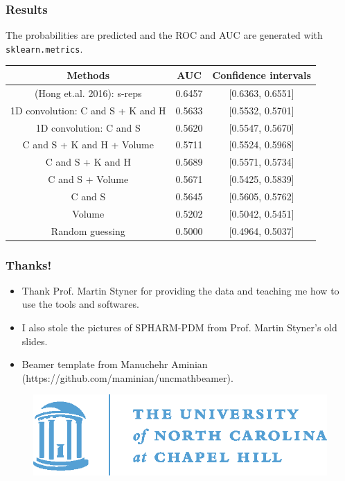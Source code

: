\documentclass{beamer}
\begin{document}
\begin{frame}
\frametitle{Results}
The probabilities are predicted and the ROC and AUC are generated with \texttt{sklearn.metrics}.
\begin{center}
\begin{tabular}{|c|c|c|}\hline
Methods & AUC & Confidence intervals \\ \hline
(Hong et.al. 2016): s-reps & 0.6457 & [0.6363, 0.6551] \\ \hline
1D convolution: C and S + K and H & 0.5633 & [0.5532, 0.5701] \\ \hline
1D convolution: C and S & 0.5620 & [0.5547, 0.5670] \\ \hline
C and S + K and H + Volume & 0.5711 & [0.5524, 0.5968] \\ \hline
C and S + K and H & 0.5689 & [0.5571, 0.5734] \\ \hline
C and S + Volume & 0.5671 & [0.5425, 0.5839] \\ \hline
C and S& 0.5645 & [0.5605, 0.5762] \\ \hline
Volume& 0.5202 & [0.5042, 0.5451] \\ \hline
Random guessing & 0.5000 & [0.4964, 0.5037] \\ \hline
\end{tabular}
\end{center}
\end{frame}

\begin{frame}
\frametitle{Thanks!}
\begin{itemize}
    \item Thank Prof. Martin Styner for providing the data and teaching me how to use the tools and softwares.
    \item I also stole the pictures of SPHARM-PDM from Prof. Martin Styner's old slides.
    \item Beamer template from Manuchehr Aminian (https://github.com/maminian/uncmathbeamer).
\end{itemize}
\vspace{1em}

\begin{figure}
\centering
\includegraphics[width=0.5\linewidth]{oldwell_cmyk}
\end{figure}
\end{frame}
\end{document}
